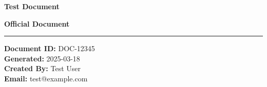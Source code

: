 \documentclass[12pt]{article}
\begin{document}
\begin{center}
    {\Large\textbf{Test Document}}
    \vspace{0.5cm}
    
    {\large\textbf{Official Document}}
    \vspace{1cm}
\end{center}

\noindent\rule{\linewidth}{1pt}
\vspace{0.5cm}

\noindent\textbf{Document ID:} DOC-12345\\
\noindent\textbf{Generated:} 2025-03-18\\
\noindent\textbf{Created By:} Test User\\
\noindent\textbf{Email:} test@example.com

\vspace{1cm}

\begin{center}
\end{center}
\end{document}
